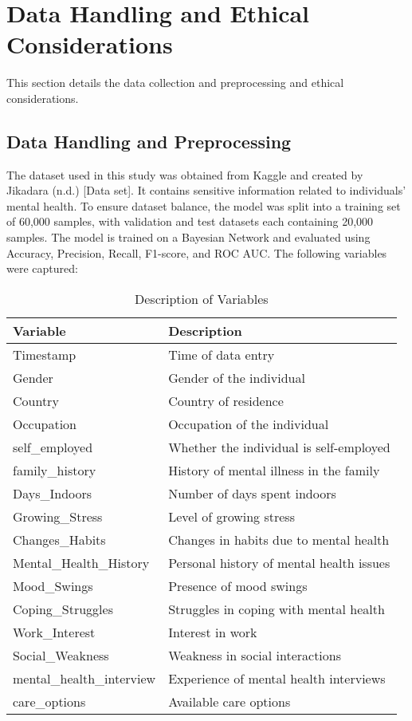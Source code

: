 \documentclass[conference]{IEEEtran}
\begin{document}
\section{Data Handling and Ethical Considerations}
This section details the data collection and preprocessing and ethical considerations. 

\subsection{Data Handling and Preprocessing}
The dataset used in this study was obtained from Kaggle and created by Jikadara (n.d.) [Data set]. It contains sensitive information related to individuals' mental health.  To ensure dataset balance, the model was split into a training set of 60,000 samples, with validation and test datasets each containing 20,000 samples. The model is trained on a Bayesian Network and evaluated using Accuracy, Precision, Recall, F1-score, and ROC AUC. The following variables were captured:

\begin{table}[htbp]
    \centering
    \caption{Description of Variables}
    \label{tab:variables}
    \begin{tabular}{@{}ll@{}}
        \toprule
        \textbf{Variable} & \textbf{Description} \\
        \midrule
        Timestamp & Time of data entry \\
        Gender & Gender of the individual \\
        Country & Country of residence \\
        Occupation & Occupation of the individual \\
        self\_employed & Whether the individual is self-employed \\
        family\_history & History of mental illness in the family \\
        Days\_Indoors & Number of days spent indoors \\
        Growing\_Stress & Level of growing stress \\
        Changes\_Habits & Changes in habits due to mental health \\
        Mental\_Health\_History & Personal history of mental health issues \\
        Mood\_Swings & Presence of mood swings \\
        Coping\_Struggles & Struggles in coping with mental health \\
        Work\_Interest & Interest in work \\
        Social\_Weakness & Weakness in social interactions \\
        mental\_health\_interview & Experience of mental health interviews \\
        care\_options & Available care options \\
        \bottomrule
    \end{tabular}
\end{table}
\end{document}
